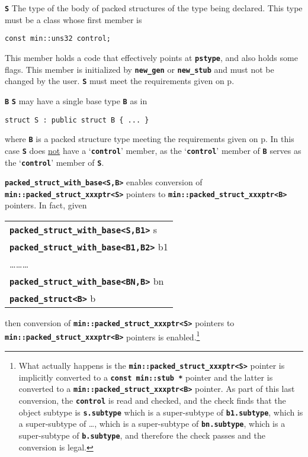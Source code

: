 \documentclass[12pt]{article}
\newcommand{\TT}[1]{{\tt \bfseries #1}}
\newcommand{\pagref}[1]{p\pageref{#1}}
\newcommand{\EOL}{\penalty \exhyphenpenalty}
\newenvironment{indpar}[1][0.3in]%
	{\begin{list}{}%
		     {\setlength{\itemsep}{0in}%
		      \setlength{\topsep}{0in}%
		      \setlength{\parsep}{1ex}%
		      \setlength{\labelwidth}{#1}%
		      \setlength{\leftmargin}{#1}%
		      \addtolength{\leftmargin}{\labelsep}}%
	 \item}%
	{\end{list}}
\newenvironment{itemlist}[1][1.2in]%
	{\begin{list}{}{\setlength{\labelwidth}{#1}%
		        \setlength{\leftmargin}{\labelwidth}%
		        \addtolength{\leftmargin}{+0.2in}%
		        \renewcommand{\makelabel}[1]{##1\hfill}}}%
	{\end{list}}
\begin{document}
\begin{itemlist}[0.5in]

\item[\TT{S}]
The type of the body of packed structures of the type being
declared.  This type must be a class whose first
member is
\begin{center}
\verb|const min::uns32 control;|
\end{center}
This member holds a code that effectively
points at \TT{pstype}, and also holds some flags.
This member is initialized by \TT{new\_gen} or \TT{new\_stub} and must not
be changed by the user.
\TT{S} must meet the requirements given on
\pagref{PACKED-STRUCTURE-TYPE-REQUIREMENTS}.

\item[\TT{B}]
\TT{S} may have a single base type \TT{B} as in
\begin{indpar}\begin{verbatim}
struct S : public struct B { ... }
\end{verbatim}\end{indpar}
where \TT{B} is a packed structure type meeting the requirements given
on \pagref{PACKED-STRUCTURE-TYPE-REQUIREMENTS}.
In this case \TT{S} does
\underline{not} have a `\TT{control}' member, as
the `\TT{control}' member of \TT{B} serves as
the `\TT{control}' member of \TT{S}.

\TT{packed\_\EOL struct\_\EOL with\_\EOL base<S,B>}
enables conversion of
\TT{min::\EOL packed\_\EOL struct\_\EOL xxxptr<S>} pointers
to \TT{min::\EOL packed\_\EOL struct\_\EOL xxxptr<B>}
pointers.  In fact, given
\begin{center}
\begin{tabular}{l}
\TT{packed\_\EOL struct\_\EOL with\_\EOL base<S,B1>} s \\
\TT{packed\_\EOL struct\_\EOL with\_\EOL base<B1,B2>} b1 \\
\ldots\ldots\ldots \\
\TT{packed\_\EOL struct\_\EOL with\_\EOL base<BN,B>} bn \\
\TT{packed\_\EOL struct<B>} b \\
\end{tabular}
\end{center}
then conversion of
\TT{min::\EOL packed\_\EOL struct\_\EOL xxxptr<S>} pointers
to \TT{min::\EOL packed\_\EOL struct\_\EOL xxxptr<B>}
pointers is enabled.\footnote{What actually happens is the
\TT{min::\EOL packed\_\EOL struct\_\EOL xxxptr<S>} pointer
is implicitly converted to a \TT{const min::\EOL stub *} pointer and the
latter is converted to a
\TT{min::\EOL packed\_\EOL struct\_\EOL xxxptr<B>} pointer.
As part of this last conversion, the \TT{control} is read and
checked, and the check finds that the object subtype
is \TT{s.subtype} which is a super-subtype of
\TT{b1.subtype}, which is a super-subtype of \ldots, which
is a super-subtype of \TT{bn.subtype}, which is a super-subtype
of \TT{b.subtype}, and therefore the check passes and the
conversion is legal.}

\end{itemlist}
\end{document}
